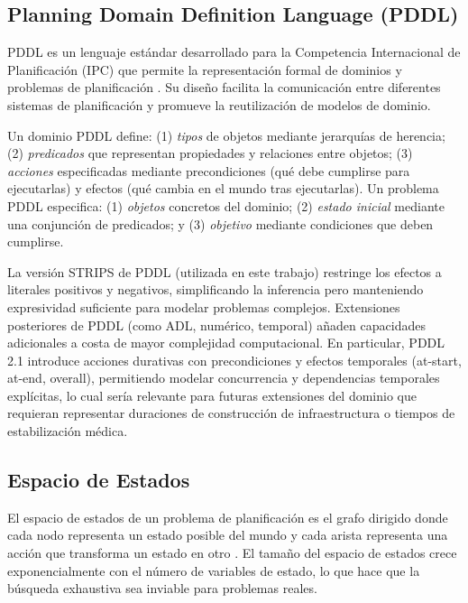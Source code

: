 \documentclass[conference]{IEEEtran}
\begin{document}
    \subsection{Planning Domain Definition Language (PDDL)}

    PDDL es un lenguaje estándar desarrollado para la Competencia Internacional de Planificación (IPC) que permite la representación formal de dominios y problemas de planificación \cite{ghallab2004automated}. Su diseño facilita la comunicación entre diferentes sistemas de planificación y promueve la reutilización de modelos de dominio.

    Un dominio PDDL define: (1) \textit{tipos} de objetos mediante jerarquías de herencia; (2) \textit{predicados} que representan propiedades y relaciones entre objetos; (3) \textit{acciones} especificadas mediante precondiciones (qué debe cumplirse para ejecutarlas) y efectos (qué cambia en el mundo tras ejecutarlas). Un problema PDDL especifica: (1) \textit{objetos} concretos del dominio; (2) \textit{estado inicial} mediante una conjunción de predicados; y (3) \textit{objetivo} mediante condiciones que deben cumplirse.

    La versión STRIPS de PDDL (utilizada en este trabajo) restringe los efectos a literales positivos y negativos, simplificando la inferencia pero manteniendo expresividad suficiente para modelar problemas complejos. Extensiones posteriores de PDDL (como ADL, numérico, temporal) añaden capacidades adicionales a costa de mayor complejidad computacional. En particular, PDDL 2.1 \cite{fox2003pddl} introduce acciones durativas con precondiciones y efectos temporales (at-start, at-end, overall), permitiendo modelar concurrencia y dependencias temporales explícitas, lo cual sería relevante para futuras extensiones del dominio que requieran representar duraciones de construcción de infraestructura o tiempos de estabilización médica.

    \subsection{Espacio de Estados}

    El espacio de estados de un problema de planificación es el grafo dirigido donde cada nodo representa un estado posible del mundo y cada arista representa una acción que transforma un estado en otro \cite{russell2020aima}. El tamaño del espacio de estados crece exponencialmente con el número de variables de estado, lo que hace que la búsqueda exhaustiva sea inviable para problemas reales.
\end{document}
